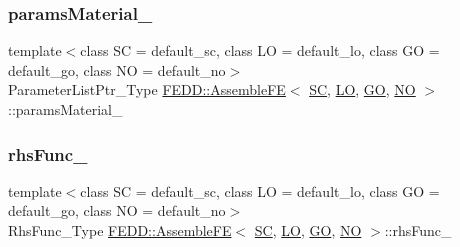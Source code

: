 \subsubsection{\texorpdfstring{params\+Material\+\_\+}{paramsMaterial\_}}
{\footnotesize\ttfamily template$<$class SC  = default\+\_\+sc, class LO  = default\+\_\+lo, class GO  = default\+\_\+go, class NO  = default\+\_\+no$>$ \\
Parameter\+List\+Ptr\+\_\+\+Type \hyperlink{classFEDD_1_1AssembleFE}{F\+E\+D\+D\+::\+Assemble\+FE}$<$ \hyperlink{fe__test__laplace_8cpp_a79c7e86a57edbb2a5a53242bcd04e41e}{SC}, \hyperlink{fe__test__laplace_8cpp_ad6a38c9f07d3fd633eefca5bccad8410}{LO}, \hyperlink{fe__test__laplace_8cpp_afa2946b509009b4f45eb04bd8c5b27d9}{GO}, \hyperlink{fe__test__laplace_8cpp_a5e24f37b28787429872b6ecb1d0417ce}{NO} $>$\+::params\+Material\+\_\+\hspace{0.3cm}{\ttfamily [protected]}}

\mbox{\label{classFEDD_1_1AssembleFE_a2c3232bc8b6d6d9e23ab0a745e103e2a}} 
\subsubsection{\texorpdfstring{rhs\+Func\+\_\+}{rhsFunc\_}}
{\footnotesize\ttfamily template$<$class SC  = default\+\_\+sc, class LO  = default\+\_\+lo, class GO  = default\+\_\+go, class NO  = default\+\_\+no$>$ \\
Rhs\+Func\+\_\+\+Type \hyperlink{classFEDD_1_1AssembleFE}{F\+E\+D\+D\+::\+Assemble\+FE}$<$ \hyperlink{fe__test__laplace_8cpp_a79c7e86a57edbb2a5a53242bcd04e41e}{SC}, \hyperlink{fe__test__laplace_8cpp_ad6a38c9f07d3fd633eefca5bccad8410}{LO}, \hyperlink{fe__test__laplace_8cpp_afa2946b509009b4f45eb04bd8c5b27d9}{GO}, \hyperlink{fe__test__laplace_8cpp_a5e24f37b28787429872b6ecb1d0417ce}{NO} $>$\+::rhs\+Func\+\_\+\hspace{0.3cm}{\ttfamily [protected]}}

\mbox{\label{classFEDD_1_1AssembleFE_a8eff2b1a9fc0125931206e83e2ab8bbd}} 
